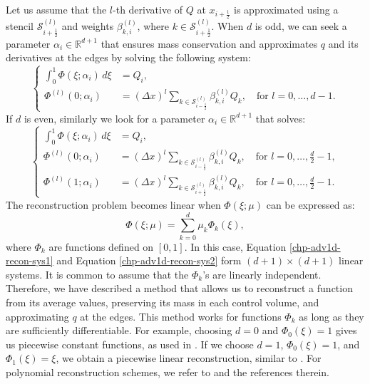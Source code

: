 Let us assume that the $l$-th derivative of $Q$ at $x_{i+\frac{1}{2}}$ is approximated using a
stencil $\mathcal{S}^{(l)}_{i+\frac{1}{2}}$ and weights $\beta^{(l)}_{k,i}$, where 
$k \in \mathcal{S}^{(l)}_{i+\frac{1}{2}}$. When $d$ is odd, we can seek a parameter
$\alpha_i \in \mathbb{R}^{d+1}$ that ensures mass conservation and approximates
$q$ and its derivatives at the edges by solving the following system:
\begin{equation}
	\label{chp-adv1d-recon-sys1}
	\begin{cases}
		\int_{0}^{1} \Phi(\xi;\alpha_i) \,d\xi &= {Q}_i,\\
		\Phi^{(l)}(0;\alpha_i) &= (\Delta x)^l \sum_{k \in 
		\mathcal{S}^{(l)}_{i-\frac{1}{2}}} \beta_{k,i}^{(l)} {Q}_k, \quad \text{for } l = 0, \ldots, d-1.
	\end{cases}
\end{equation}
If $d$ is even, similarly we look for a parameter $\alpha_i \in \mathbb{R}^{d+1}$ that solves:
\begin{equation}
	\begin{cases}
		\label{chp-adv1d-recon-sys2}
		\int_{0}^{1} \Phi(\xi;\alpha_i) \,d\xi &= {Q}_i,\\
		\Phi^{(l)}(0;\alpha_i) &= (\Delta x)^l \sum_{k \in \mathcal{S}^{(l)}_{i-\frac{1}{2}}} \beta_{k,i}^{(l)} {Q}_k, \quad \text{for } l = 0, \ldots, \frac{d}{2}-1,\\
		\Phi^{(l)}(1;\alpha_i) &= (\Delta x)^l \sum_{k \in \mathcal{S}^{(l)}_{i+\frac{1}{2}}} \beta_{k,i}^{(l)} {Q}_k, \quad \text{for } l = 0, \ldots, \frac{d}{2}-1.
	\end{cases}
\end{equation}
The reconstruction problem becomes linear when $\Phi(\xi;\mu)$ can be expressed as:
\begin{equation*}
	\Phi(\xi;\mu) = \sum_{k=0}^d \mu_k \Phi_k(\xi),
\end{equation*}
where $\Phi_k$ are functions defined on $[0,1]$. In this case, Equation 
\eqref{chp-adv1d-recon-sys1} and Equation \eqref{chp-adv1d-recon-sys2} form $(d+1)\times (d+1)$ linear systems.
It is common to assume that the $\Phi_k$'s are linearly independent.
Therefore, we have described a method that allows us to reconstruct a 
function from its average values, preserving its mass in each control volume, 
and approximating $q$ at the edges. This method works for functions $\Phi_k$
as long as they are sufficiently differentiable.
For example, choosing $d=0$ and $\Phi_0(\xi)=1$ gives us piecewise constant
functions, as used in \citet{godunov:1959}.
If we choose $d=1$, $\Phi_0(\xi)=1$, and $\Phi_1(\xi)=\xi$, we 
obtain a piecewise linear reconstruction, similar to \citet{vanleer:1977}.
For polynomial reconstruction schemes, we refer to \citet{engwirda:2016} and the references therein.



